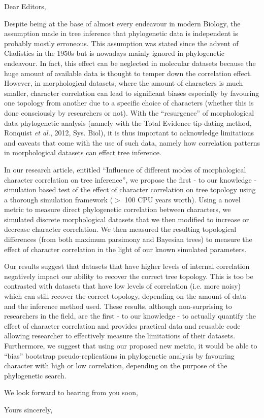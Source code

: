 \documentclass[11pt]{letter}
\begin{document}
\begin{letter}{}
\opening{Dear Editors,}

Despite being at the base of almost every endeavour in modern Biology, the assumption made in tree inference that phylogenetic data is independent is probably mostly erroneous.
This assumption was stated since the advent of Cladistics in the 1950s but is nowadays mainly ignored in phylogenetic endeavour.
In fact, this effect can be neglected in molecular datasets because the huge amount of available data is thought to temper down the correlation effect.
However, in morphological datasets, where the amount of characters is much smaller, character correlation can lead to significant biases especially by favouring one topology from another due to a specific choice of characters (whether this is done consciously by researchers or not).
With the ``resurgence'' of morphological data phylogenetic analysis (namely with the Total Evidence tip-dating method, Ronquist \textit{et al.}, 2012, Sys. Biol), it is thus important to acknowledge limitations and caveats that come with the use of such data, namely how correlation patterns in morphological datasets can effect tree inference.

In our research article, entitled ``Influence of different modes of morphological character correlation on tree inference'', we propose the first - to our knowledge - simulation based test of the effect of character correlation on tree topology using a thorough simulation framework ($>$ 100 CPU years worth).
Using a novel metric to measure direct phylogenetic correlation between characters, we simulated discrete morphological datasets that we then modified to increase or decrease character correlation.
We then measured the resulting topological differences (from both maximum parsimony and Bayesian trees) to measure the effect of character correlation in the light of our known simulated parameters.

Our results suggest that datasets that have higher levels of internal correlation negatively impact our ability to recover the correct tree topology.
This is too be contrasted with datasets that have low levels of correlation (i.e. more noisy) which can still recover the correct topology, depending on the amount of data and the inference method used.
These results, although non-surprising to researchers in the field, are the first - to our knowledge - to actually quantify the effect of character correlation and provides practical data and reusable code allowing researcher to effectively measure the limitations of their datasets.
Furthermore, we suggest that using our proposed new metric, it would be able to ``bias'' bootstrap pseudo-replications in phylogenetic analysis by favouring character with high or low correlation, depending on the purpose of the phylogenetic search.

We look forward to hearing from you soon,

\closing{Yours sincerely,}


\end{letter}
\end{document}
